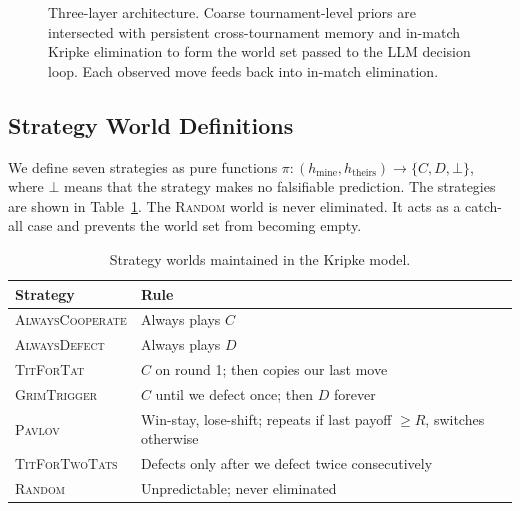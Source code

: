 \documentclass[11pt]{article}
\begin{document}
\begin{figure}[h]
\caption{Three-layer architecture. Coarse tournament-level priors are intersected with
persistent cross-tournament memory and in-match Kripke elimination to form the world set
passed to the LLM decision loop. Each observed move feeds back into in-match elimination.}
\label{fig:architecture}
\end{figure}


\subsection{Strategy World Definitions}

We define seven strategies as pure functions
$\pi : (h_{\text{mine}}, h_{\text{theirs}}) \to \{C, D, \bot\}$, where $\bot$ means that the
strategy makes no falsifiable prediction. The strategies are shown in Table~\ref{tab:strategies}.
The \textsc{Random} world is never eliminated. It acts as a catch-all case and prevents the
world set from becoming empty.

\begin{table}[h]
\centering
\small
\begin{tabular}{@{}lp{7cm}@{}}
\toprule
Strategy & Rule \\
\midrule
\textsc{AlwaysCooperate} & Always plays $C$ \\
\textsc{AlwaysDefect}    & Always plays $D$ \\
\textsc{TitForTat}       & $C$ on round 1; then copies our last move \\
\textsc{GrimTrigger}     & $C$ until we defect once; then $D$ forever \\
\textsc{Pavlov}          & Win-stay, lose-shift; repeats if last payoff $\geq R$, switches otherwise \\
\textsc{TitForTwoTats}   & Defects only after we defect twice consecutively \\
\textsc{Random}          & Unpredictable; never eliminated \\
\bottomrule
\end{tabular}
\caption{Strategy worlds maintained in the Kripke model.}
\label{tab:strategies}
\end{table}
\end{document}
